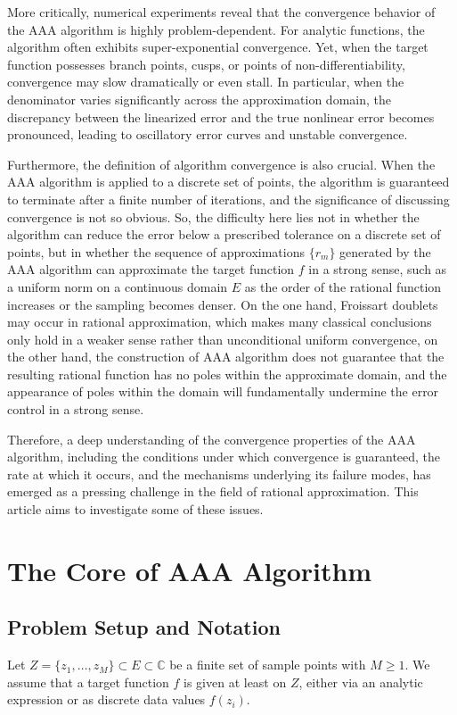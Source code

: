 \documentclass[12pt,a4paper]{article}  %
\theoremstyle{definition}
\numberwithin{equation}{section}
\begin{document}
More critically, numerical experiments reveal that the convergence behavior of the AAA algorithm is highly problem-dependent. For analytic functions, the algorithm often exhibits super-exponential convergence. Yet, when the target function possesses branch points, cusps, or points of non-differentiability, convergence may slow dramatically or even stall. In particular, when the denominator varies significantly across the approximation domain, the discrepancy between the linearized error and the true nonlinear error becomes pronounced, leading to oscillatory error curves and unstable convergence. 

Furthermore, the definition of algorithm convergence is also crucial. When the AAA algorithm is applied to a discrete set of points, the algorithm is guaranteed to terminate after a finite number of iterations, and the significance of discussing convergence is not so obvious. So, the difficulty here lies not in whether the algorithm can reduce the error below a prescribed tolerance on a discrete set of points, but in whether the sequence of approximations $\{r_m\}$ generated by the AAA algorithm can approximate the target function $f$ in a strong sense, such as a uniform norm on a continuous domain $E$ as the order of the rational function increases or the sampling becomes denser. On the one hand, Froissart doublets may occur in rational approximation, which makes many classical conclusions only hold in a weaker sense rather than unconditional uniform convergence, on the other hand, the construction of AAA algorithm does not guarantee that the resulting rational function has no poles within the approximate domain, and the appearance of poles within the domain will fundamentally undermine the error control in a strong sense.

Therefore, a deep understanding of the convergence properties of the AAA algorithm, including the conditions under which convergence is guaranteed, the rate at which it occurs, and the mechanisms underlying its failure modes, has emerged as a pressing challenge in the field of rational approximation. This article aims to investigate some of these issues.

\section{The Core of AAA Algorithm}
\subsection{Problem Setup and Notation}
Let $Z=\{z_1,\dots,z_M\}\subset E\subset \mathbb{C}$ be a finite set of sample points with $M\ge1$. We assume that a target function $f$ is given at least on $Z$, either via an analytic expression or as discrete data values $f(z_i)$.
\end{document}
